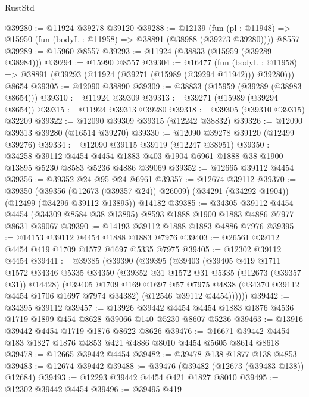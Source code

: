 \begin{lexlean}{RustStd}
\begin{coremodule}
@39280 := @11924 @39278 @39120
@39288 := @12139
    (fun (pl : @11948) => @15950 (fun (bodyL : @11958) => @38891 (@38988 (@39273 @39280))))
    @8557
@39289 := @15960 @8557
@39293 := @11924 (@38833 (@15959 (@39289 @38984)))
@39294 := @15990 @8557
@39304 := @16477
    (fun (bodyL : @11958) => @38891 (@39293 (@11924 (@39271 (@15989 (@39294 @11942))) @39280)))
    @8654
@39305 := @12090 @38890
@39309 := @38833 (@15959 (@39289 (@38983 @8654)))
@39310 := @11924 @39309
@39313 := @39271 (@15989 (@39294 @8654))
@39315 := @11924 @39313 @39280
@39318 := @39305 (@39310 @39315) @32209
@39322 := @12090 @39309 @39315 (@12242 @38832)
@39326 := @12090 @39313 @39280 (@16514 @39270)
@39330 := @12090 @39278 @39120 (@12499 @39276)
@39334 := @12090 @39115 @39119 (@12247 @38951)
@39350 := @34258
    @39112
    @4454
    @4454
    @1883
    @403
    @1904
    @6961
    @1888
    @38
    @1900
    @13895
    @5230
    @8583
    @5236
    @4886
    @39069
@39352 := @12665 @39112 @4454
@39356 := @39352 @24 @95 @24 @6961
@39357 := @12674 @39112
@39370 := @39350
    (@39356 (@12673 (@39357 @24)) @26009)
    (@34291 (@34292 @1904))
    (@12499 (@34296 @39112 @13895))
    @14182
@39385 := @34305
    @39112
    @4454
    @4454
    (@34309 @8584 @38 @13895)
    @8593
    @1888
    @1900
    @1883
    @4886
    @7977
    @8631
    @39067
@39390 := @14193 @39112 @1888 @1883 @4886 @7976
@39395 := @14153 @39112 @4454 @1888 @1883 @7976
@39403 := @26561 @39112 @4454 @419 @1709 @1572 @1697 @5335 @7975
@39405 := @12302 @39112 @4454
@39441 := @39385
    (@39390
      (@39395
        (@39403
          (@39405
            @419
            @1711
            @1572
            @34346
            @5335
            @34350
            (@39352 @31 @1572 @31 @5335 (@12673 (@39357 @31)) @14428)
            (@39405
              @1709
              @169
              @1697
              @57
              @7975
              @4838
              (@34370 @39112 @4454 @1706 @1697 @7974 @34382)
              (@12546 @39112 @4454))))))
@39442 := @34395 @39112
@39457 := @13926
    @39442
    @4454
    @4454
    @1883
    @1876
    @4536
    @1719
    @1899
    @454
    @8628
    @39066
    @140
    @5230
    @8607
    @5236
@39463 := @13916 @39442 @4454 @1719 @1876 @8622 @8626
@39476 := @16671 @39442 @4454 @183 @1827 @1876 @4853 @421 @4886 @8010 @4454 @5605 @8614 @8618
@39478 := @12665 @39442 @4454
@39482 := @39478 @138 @1877 @138 @4853
@39483 := @12674 @39442
@39488 := @39476 (@39482 (@12673 (@39483 @138)) @12684)
@39493 := @12293 @39442 @4454 @421 @1827 @8010
@39495 := @12302 @39442 @4454
@39496 := @39495 @419

\end{coremodule}
\end{lexlean}
